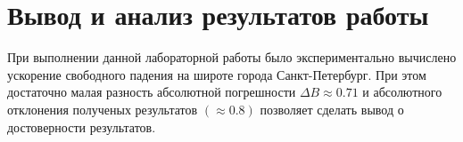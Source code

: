 \section{Вывод и анализ результатов работы}
При выполнении данной лабораторной работы было экспериментально вычислено
ускорение свободного падения на широте города Санкт-Петербург.
При этом достаточно малая разность абсолютной погрешности $\Delta B \approx 0.71$ и
абсолютного отклонения полученых результатов $(\approx 0.8)$ позволяет сделать вывод
о достоверности результатов.
